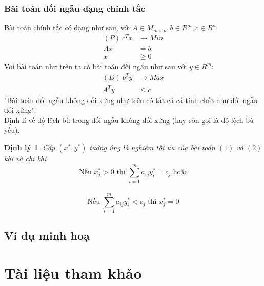 \documentclass{article}
\newtheorem{dl}{Định lý}
\begin{document}
        \subsubsection{Bài toán đối ngẫu dạng chính tắc}
            Bài toán chính tắc có dạng như sau, với $A \in M_{m \times n},b \in R^m, c \in R^n$:
                \begin{equation}
                    \begin{split}
                        (P) \: c^Tx &\rightarrow Min \\
                        Ax&=b \\
                        x &\geq 0
                    \end{split}
                \end{equation}
            Với bài toán như trên ta có bài toán đối ngẫu như sau với $y \in R^m$:
                \begin{equation}
                    \begin{split}
                        (D) \: b^Ty &\rightarrow Max \\
                        A^Ty &\leq c
                    \end{split}
                \end{equation}
            "Bài toán đối ngẫu không đối xứng như trên có tất cả cá tính chất như đối ngẫu đối xứng". \\
            Định lí về độ lệch bù trong đối ngẫu không đối xứng (hay còn gọi là độ lệch bù yếu).
            \begin{dl}
                Cặp $(x^*,y^*)$ tướng ứng là nghiệm tối ưu của bài toán $(1)$ và $(2)$ khi và chỉ khi
                $$\text{Nếu } x_j^* > 0 \text{ thì } \sum_{i=1}^ma_{ij}y_i^*=c_j \text{ hoặc}$$ \\
                $$\text{Nếu } \sum_{i=1}^ma_{ij}y_i^* < c_j \text{ thì } x_j^*=0$$
            \end{dl}
    \subsection{Ví dụ minh hoạ}

\section{Tài liệu tham khảo}



\end{document}
